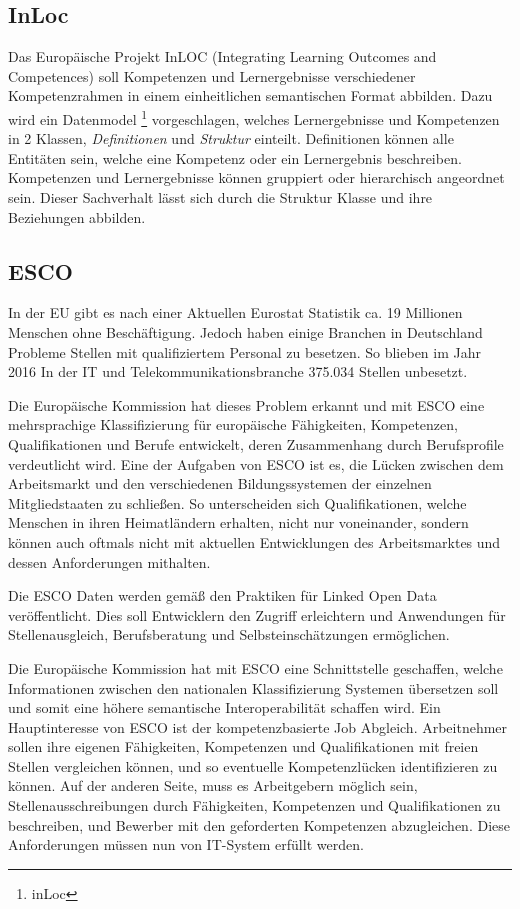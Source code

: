 \subsection{InLoc}\label{inloc}

Das Europäische Projekt InLOC (Integrating Learning Outcomes and Competences) soll Kompetenzen und Lernergebnisse verschiedener Kompetenzrahmen in einem einheitlichen semantischen Format abbilden. Dazu wird ein Datenmodel \footnote{inLoc\cite{inloc}} vorgeschlagen, welches Lernergebnisse und Kompetenzen in 2 Klassen, \emph{Definitionen} und \emph{Struktur} einteilt. Definitionen können alle Entitäten sein, welche eine Kompetenz oder ein Lernergebnis beschreiben. Kompetenzen und Lernergebnisse können gruppiert oder hierarchisch angeordnet sein. Dieser Sachverhalt lässt sich durch die Struktur Klasse und ihre Beziehungen abbilden.

\subsection{ESCO}

In der EU gibt es nach einer Aktuellen Eurostat Statistik ca. 19 Millionen Menschen ohne Beschäftigung. Jedoch haben einige Branchen in Deutschland Probleme Stellen mit qualifiziertem Personal zu besetzen. So blieben im Jahr 2016 In der IT und Telekommunikationsbranche 375.034 Stellen unbesetzt.\cite{Statista2016}
 
Die Europäische Kommission hat dieses Problem erkannt und mit ESCO eine mehrsprachige Klassifizierung für europäische Fähigkeiten, Kompetenzen, Qualifikationen und Berufe entwickelt, deren Zusammenhang durch Berufsprofile verdeutlicht wird.
 Eine der Aufgaben von ESCO ist es, die Lücken zwischen dem Arbeitsmarkt und den verschiedenen Bildungssystemen der einzelnen Mitgliedstaaten zu schließen. So unterscheiden sich Qualifikationen, welche Menschen in ihren Heimatländern erhalten, nicht nur voneinander, sondern können auch oftmals nicht mit aktuellen Entwicklungen des Arbeitsmarktes und dessen Anforderungen mithalten.
\newline

Die ESCO Daten werden gemäß den Praktiken für Linked Open Data veröffentlicht. Dies soll Entwicklern den Zugriff erleichtern und Anwendungen für Stellenausgleich, Berufsberatung und Selbsteinschätzungen ermöglichen.\newline

Die Europäische Kommission hat mit ESCO eine Schnittstelle geschaffen, welche Informationen zwischen den nationalen Klassifizierung Systemen übersetzen soll und somit eine höhere semantische Interoperabilität schaffen wird. Ein Hauptinteresse von ESCO ist der kompetenzbasierte Job Abgleich. Arbeitnehmer sollen ihre eigenen Fähigkeiten, Kompetenzen und Qualifikationen mit freien Stellen vergleichen können, und so eventuelle Kompetenzlücken identifizieren zu können. Auf der anderen Seite, muss es Arbeitgebern möglich sein, Stellenausschreibungen durch  Fähigkeiten, Kompetenzen und Qualifikationen zu beschreiben, und Bewerber mit den geforderten Kompetenzen abzugleichen. Diese Anforderungen müssen nun von IT-System erfüllt werden. 

